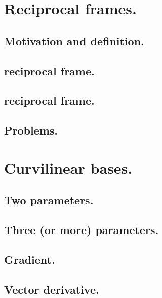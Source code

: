 %
%
   \section{Reciprocal frames.}
      \subsection{Motivation and definition.}
         
         
      \subsection{ reciprocal frame.}
         
      \subsection{ reciprocal frame.}
         
      \subsection{Problems.}
         
         
         
   \section{Curvilinear bases.}
      \subsection{Two parameters.}
         
      \subsection{Three (or more) parameters.}
         
      \subsection{Gradient.}
         
      \subsection{Vector derivative.}
         
